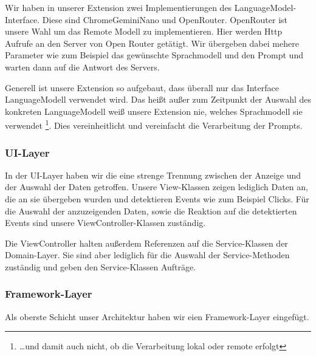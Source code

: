   Wir haben in unserer Extension zwei Implementierungen des LanguageModel-Interface. Diese sind ChromeGeminiNano und OpenRouter. OpenRouter ist unsere Wahl um das Remote Modell zu implementieren. Hier werden Http Aufrufe an den Server von Open Router getätigt. Wir übergeben dabei mehere Parameter wie zum Beispiel das gewünschte Sprachmodell und den Prompt und warten dann auf die Antwort des Servers.

  Generell ist unsere Extension so aufgebaut, dass überall nur das Interface LanguageModell verwendet wird. Das heißt außer zum Zeitpunkt der Auswahl des konkreten LanguageModell weiß unsere Extension nie, welches Sprachmodell sie verwendet \footnote{\dots und damit auch nicht, ob die Verarbeitung lokal oder remote erfolgt}. Dies vereinheitlicht und vereinfacht die Verarbeitung der Prompts.

  \subsubsection{UI-Layer}

  In der UI-Layer haben wir die eine strenge Trennung zwischen der Anzeige und der Auswahl der Daten getroffen. Unsere View-Klassen zeigen lediglich Daten an, die an sie übergeben wurden und detektieren Events wie zum Beispiel Clicks. Für die Auswahl der anzuzeigenden Daten, sowie die Reaktion auf die detektierten Events sind unsere ViewController-Klassen zuständig.

  Die ViewController halten außerdem Referenzen auf die Service-Klassen der Domain-Layer. Sie sind  aber lediglich für die Auswahl der Service-Methoden zuständig und geben den Service-Klassen Aufträge.

  \subsubsection{Framework-Layer}

  Als oberste Schicht unser Architektur haben wir eien Framework-Layer eingefügt.